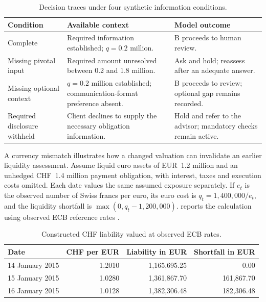 \documentclass[oneside,10pt,english]{swissi}
\begin{document}
\begin{table}[htbp]
\centering
\caption{Decision traces under four synthetic information conditions.}
\label{tab:case-states}
\small
\begin{tabularx}{\textwidth}{@{}>{\raggedright\arraybackslash}p{} >{\raggedright\arraybackslash}X >{\raggedright\arraybackslash}X@{}}
\toprule
Condition & Available context & Model outcome \\
\midrule
Complete & Required information established; $q=0.2$ million. & B proceeds to human review. \\
Missing pivotal input & Required amount unresolved between 0.2 and 1.8 million. & Ask and hold; reassess after an adequate answer. \\
Missing optional context & $q=0.2$ million established; communication-format preference absent. & B proceeds to review; optional gap remains recorded. \\
Required disclosure withheld & Client declines to supply the necessary obligation information. & Hold and refer to the advisor; mandatory checks remain active. \\
\bottomrule
\end{tabularx}
\end{table}

A currency mismatch illustrates how a changed valuation can invalidate an earlier liquidity assessment. Assume liquid euro assets of EUR~1.2 million and an unhedged CHF~1.4 million payment obligation, with interest, taxes and execution costs omitted. Each date values the same assumed exposure separately. If $e_t$ is the observed number of Swiss francs per euro, its euro cost is $q_t=1{,}400{,}000/e_t$, and the liquidity shortfall is $\max(0,q_t-1{,}200{,}000)$.  reports the calculation using observed ECB reference rates \parencite{ecb2026chfeur}.

\begin{table}[htbp]
\centering
\caption{Constructed CHF liability valued at observed ECB rates.}
\label{tab:fx-replay}
\small
\begin{tabular*}{\textwidth}{@{\extracolsep{\fill}}lrrr@{}}
\toprule
Date & CHF per EUR & Liability in EUR & Shortfall in EUR \\
\midrule
14 January 2015 & 1.2010 & 1,165,695.25 & 0.00 \\
15 January 2015 & 1.0280 & 1,361,867.70 & 161,867.70 \\
16 January 2015 & 1.0128 & 1,382,306.48 & 182,306.48 \\
\bottomrule
\end{tabular*}
\end{table}
\end{document}
